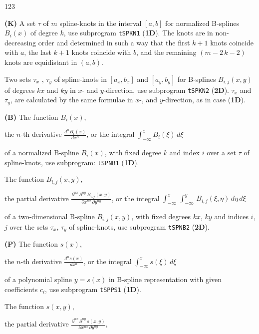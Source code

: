 \begin{DL}{123}
\item[{\bf (K)}]
A set $\tau$ of $m$ spline-knots
in the interval $[a,b]$ for normalized B-splines $B_i(x)$ of
degree $k$, use subprogram {\tt tSPKN1} ({\bf 1D}).
The knots are in non-decreasing order and determined in such a way that
the first $k+1$ knots coincide with $a$, the last $k+1$ knots coincide
with $b$, and the remaining $(m-2\,k-2)$ knots are equidistant
in $(a,b)$.
\par
Two sets $\tau_x$ , $\tau_y$ of spline-knots
in $[a_x,b_x]$ and $[a_y,b_y]$ for B-splines $B_{i,j}(x,y)$
of degrees $kx$ and $ky$ in $x$- and $y$-direction, use subprogram
{\tt tSPKN2} ({\bf 2D}).
$\tau_x$ and $\tau_y$, are calculated by the same formulae
in $x$-, and $y$-direction, as in case ({\bf 1D}).
\item[{\bf (B)}]
The function $B_i(x)$,
\begin{center}
the $n$-th derivative \quad
$\displaystyle \frac{d^n B_i(x)}{dx^n}$, \qquad
or the integral \quad $\displaystyle \int_{-\infty}^x B_i(\xi)\,d\xi$
\end{center}
of a normalized B-spline $B_i(x)$,
with fixed degree $k$ and index $i$ over a set $\tau$ of
spline-knots, use subprogram: {\tt tSPNB1} ({\bf 1D}).
\par
The function $B_{i,j}(x,y)$,
\begin{center}
the partial derivative \quad
$\displaystyle \frac{\partial^{nx}\,\partial^{ny}\,B_{i,j}(x,y)}
{\partial x^{nx}\,\partial y^{ny}}$, \qquad
or the integral \quad $\displaystyle
\int_{-\infty}^x\,\int_{-\infty}^y\,B_{i,j}(\xi,\eta)\,d\eta\,d\xi$
\end{center}
of a two-dimensional B-spline $B_{i,j}(x,y)$, with fixed
degrees $kx$, $ky$ and indices $i$, $j$  over the sets $\tau_x$,
$\tau_y$ of spline-knots, use subprogram {\tt tSPNB2} ({\bf 2D}).
\item[{\bf (P)}]
The function $s(x)$,
\begin{center}
the $n$-th derivative \quad
$\displaystyle \frac{d^n s(x)}{dx^n}$, \qquad
or the integral \quad $\displaystyle \int_{-\infty}^x s(\xi)\,d\xi$
\end{center}
of a polynomial spline $y = s(x)$ in B-spline representation with
given coefficients $c_i$, use subprogram {\tt tSPPS1} ({\bf 1D}).
\par
The function $s(x,y)$,
\begin{center}
the partial derivative \quad
$\displaystyle \frac{\partial^{nx}\,\partial^{ny}\,s(x,y)}
{\partial x^{nx}\,\partial y^{ny}}$, \qquad

\end{center}
\end{DL}
